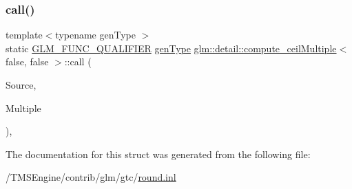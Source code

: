 \subsubsection{\texorpdfstring{call()}{call()}}
{\footnotesize\ttfamily template$<$typename gen\+Type $>$ \\
static \hyperlink{setup_8hpp_a33fdea6f91c5f834105f7415e2a64407}{G\+L\+M\+\_\+\+F\+U\+N\+C\+\_\+\+Q\+U\+A\+L\+I\+F\+I\+ER} \hyperlink{structglm_1_1detail_1_1gen_type}{gen\+Type} \hyperlink{structglm_1_1detail_1_1compute__ceil_multiple}{glm\+::detail\+::compute\+\_\+ceil\+Multiple}$<$ false, false $>$\+::call (\begin{DoxyParamCaption}\item[{\hyperlink{structglm_1_1detail_1_1gen_type}{gen\+Type}}]{Source,  }\item[{\hyperlink{structglm_1_1detail_1_1gen_type}{gen\+Type}}]{Multiple }\end{DoxyParamCaption})\hspace{0.3cm}{\ttfamily [inline]}, {\ttfamily [static]}}



The documentation for this struct was generated from the following file\+:\begin{DoxyCompactItemize}
\item 
/\+T\+M\+S\+Engine/contrib/glm/gtc/\hyperlink{round_8inl}{round.\+inl}\end{DoxyCompactItemize}
